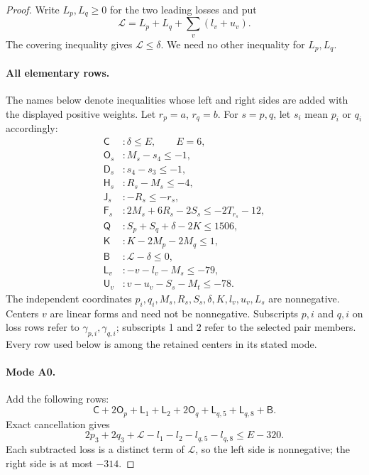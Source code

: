 \documentclass[11pt,a4paper]{article}
\theoremstyle{remark}
\begin{document}
\begin{proof}
Write $L_p,L_q\ge0$ for the two leading losses and put
\[
 \mathcal L=L_p+L_q+\sum_v(l_v+u_v).
\]
The covering inequality gives $\mathcal L\le\delta$. We need no other
inequality for $L_p,L_q$.

\paragraph{All elementary rows.}
The names below denote inequalities whose left and right sides are added
with the displayed positive weights. Let $r_p=a$, $r_q=b$. For $s=p,q$,
let $s_i$ mean $p_i$ or $q_i$ accordingly:
\begin{align*}
 \mathsf C &: \delta\le E,\qquad E=6,\\
 \mathsf O_s &: M_s-s_4\le-1,\\
 \mathsf D_s &: s_4-s_3\le-1,\\
 \mathsf H_s &: R_s-M_s\le-4,\\
 \mathsf J_s &: -R_s\le-r_s,\\
 \mathsf F_s &:2M_s+6R_s-2S_s\le-2T_{r_s}-12,\\
 \mathsf Q &:S_p+S_q+\delta-2K\le1506,\\
 \mathsf K &:K-2M_p-2M_q\le1,\\
 \mathsf B &: \mathcal L-\delta\le0,\\
 \mathsf L_v &: -v-l_v-M_s\le-79,\\
 \mathsf U_v &: v-u_v-S_s-M_t\le-78.
\end{align*}
The independent coordinates $p_i,q_i,M_s,R_s,S_s,\delta,K,l_v,u_v,L_s$
are nonnegative. Centers $v$ are linear forms and need not be nonnegative.
Subscripts
$p,i$ and $q,i$ on loss rows refer to $\gamma_{p,i},\gamma_{q,i}$;
subscripts 1 and 2 refer to the selected pair members.
Every row used below is among the retained centers in its stated mode.

\paragraph{Mode A0.}
Add the following rows:
\[
 \mathsf C+2\mathsf O_p+\mathsf L_1+\mathsf L_2
 +2\mathsf O_q+\mathsf L_{q,5}+\mathsf L_{q,8}+\mathsf B.
\]
Exact cancellation gives
\[
 2p_3+2q_3+\mathcal L-l_1-l_2-l_{q,5}-l_{q,8}
 \le E-320.
\]
Each subtracted loss is a distinct term of $\mathcal L$, so the left
side is nonnegative; the right side is at most $-314$.


\end{proof}
\end{document}
